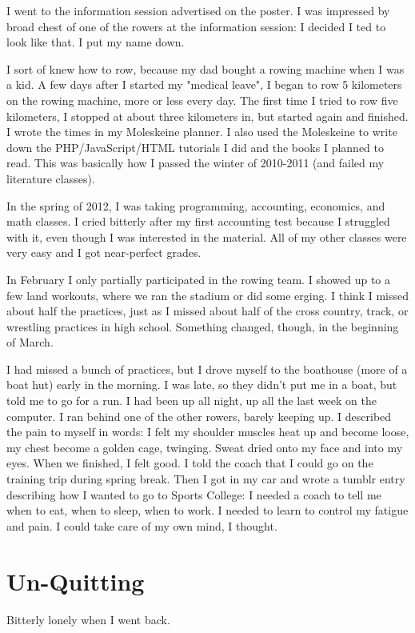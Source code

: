 \documentclass[12pt]{article}
\begin{document}
I went to the information session advertised on the poster.  I was impressed by
 broad chest of one of the rowers at the information session: I decided I
ted to look like that.  I put my name down.

I sort of knew how to row, because my dad bought a rowing machine when I was a
kid.  A few days after I started my "medical leave", I began to row 5 kilometers
on the rowing machine, more or less every day.  The first time I tried to row
five kilometers, I stopped at about three kilometers in, but started again and
finished.  I wrote the times in my Moleskeine planner.  I also used the
Moleskeine to write down the PHP/JavaScript/HTML tutorials I did and the books I
planned to read.  This was basically how I passed the winter of 2010-2011 (and
failed my literature classes).

In the spring of 2012, I was taking programming, accounting, economics, and math
classes.  I cried bitterly after my first accounting test because I struggled
with it, even though I was interested in the material.  All of my other classes
were very easy and I got near-perfect grades.

In February I only partially participated in the rowing team.  I showed up to a
few land workouts, where we ran the stadium or did some erging.  I think I
missed about half the practices, just as I missed about half of the cross
country, track, or wrestling practices in high school.  Something changed,
though, in the beginning of March.

I had missed a bunch of practices, but I drove myself to the boathouse (more of
a boat hut) early in the morning.  I was late, so they didn't put me in a boat,
but told me to go for a run.  I had been up all night, up all the last week on
the computer.  I ran behind one of the other rowers, barely keeping up.  I
described the pain to myself in words: I felt my shoulder muscles heat up and
become loose, my chest become a golden cage, twinging.  Sweat dried onto my face
and into my eyes.  When we finished, I felt good.  I told the coach that I could
go on the training trip during spring break.  Then I got in my car and wrote a
tumblr entry describing how I wanted to go to Sports College: I needed a coach
to tell me when to eat, when to sleep, when to work.  I needed to learn to
control my fatigue and pain.  I could take care of my own mind, I thought.





\section{Un-Quitting}
Bitterly lonely when I went back.
\end{document}
